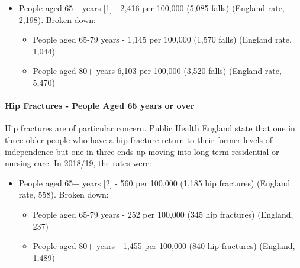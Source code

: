 \begin{itemize}[noitemsep]
    \item People aged 65+ years [1] - 2,416 per 100,000 (5,085 falls) (England rate, 2,198). Broken down:
    \begin{itemize}[noitemsep]
        \item People aged 65-79 years - 1,145 per 100,000 (1,570 falls) (England rate, 1,044)
        \item People aged 80+ years 6,103 per 100,000 (3,520 falls) (England rate, 5,470)
    \end{itemize}
\end{itemize}

\paragraph{Hip Fractures - People Aged 65 years or over} Hip fractures are of particular concern. Public Health England state that one in three older people who have a hip fracture return to their former levels of independence but one in three ends up moving into long-term residential or nursing care. In 2018/19, the rates were:


\begin{itemize}[noitemsep]
    \item People aged 65+ years [2] - 560 per 100,000 (1,185 hip fractures) (England rate, 558). Broken down:
    \begin{itemize}[noitemsep]
        \item People aged 65-79 years - 252 per 100,000 (345 hip fractures) (England, 237)
        \item People aged 80+ years - 1,455 per 100,000 (840 hip fractures) (England, 1,489)
    \end{itemize}
\end{itemize}

